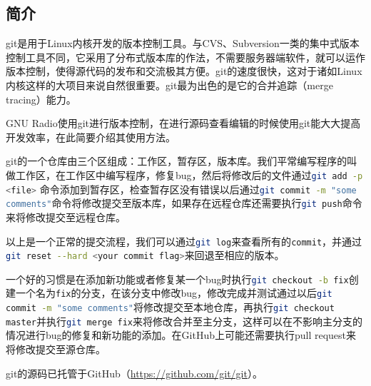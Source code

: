 		\subsection{简介}
			\par git是用于Linux内核开发的版本控制工具。与CVS、Subversion一类的集中式版本控制工具不同，它采用了分布式版本库的作法，不需要服务器端软件，就可以运作版本控制，使得源代码的发布和交流极其方便。git的速度很快，这对于诸如Linux内核这样的大项目来说自然很重要。git最为出色的是它的合并追踪（merge tracing）能力。
			\par GNU Radio使用git进行版本控制，在进行源码查看编辑的时候使用git能大大提高开发效率，在此简要介绍其使用方法。
			\par git的一个仓库由三个区组成：工作区，暂存区，版本库。我们平常编写程序的叫做工作区，在工作区中编写程序，修复bug，然后将修改后的文件通过\lstinline[language=sh]{git add -p <file>}	命令添加到暂存区，检查暂存区没有错误以后通过\lstinline[language=sh]{git commit -m "some comments"}命令将修改提交至版本库，如果存在远程仓库还需要执行\lstinline[language=sh]{git push}命令来将修改提交至远程仓库。
			\par 以上是一个正常的提交流程，我们可以通过\lstinline[language=sh]{git log}来查看所有的\lstinline[language=sh]{commit}，并通过\lstinline[language=sh]{git reset --hard <your commit flag>}来回退至相应的版本。
			\par 一个好的习惯是在添加新功能或者修复某一个bug时执行\lstinline[language=sh]{git checkout -b fix}创建一个名为\lstinline[language=sh]{fix}的分支，在该分支中修改bug，修改完成并测试通过以后\lstinline[language=sh]{git commit -m "some comments"}将修改提交至本地仓库，再执行\lstinline[language=sh]{git checkout master}并执行\lstinline[language=sh]{git merge fix}来将修改合并至主分支，这样可以在不影响主分支的情况进行bug的修复和新功能的添加。在GitHub上可能还需要执行pull request来将修改提交至源仓库。
			\par git的源码已托管于GitHub（\href{https://github.com/git/git}{https://github.com/git/git}）。
